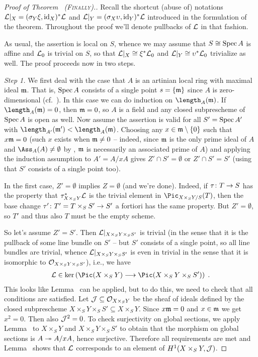\documentclass[a4paper,parskip=half,numbers=enddot, DIV=12]{scrreprt}
\begin{document}
\begin{proof}[Proof of Theorem~ \textsc{(Finally)}.]
	Recall the shortcut (abuse of) notations $\mathcal{L}|_X=(\sigma_Y\xi,\operatorname{id}_X)^*\mathcal{L}$ and $\mathcal{L}|_Y=(\sigma_X\upsilon,\operatorname{id}_Y)^*\mathcal{L}$ introduced in the formulation of the theorem. Throughout the proof we'll denote pullbacks of $\mathcal{L}$ in that fashion.
	
	As usual, the assertion is local on $S$, whence we may assume that $S\cong \operatorname{Spec} A$ is affine and $\mathcal{L}_0$ is trivial on $S$, so that $\mathcal{L}|_X\cong \xi^*\mathcal{L}_0$ and $\mathcal{L}|_Y\cong \upsilon^*\mathcal{L}_0$ trivialize as well. The proof proceeds now in two steps.
	
	\emph{Step 1.} We first deal with the case that $A$ is an artinian local ring with maximal ideal $\mathfrak{m}$. That is, $\operatorname{Spec} A$ consists of a single point $s=\{\mathfrak{m}\}$ since $A$ is zero-dimensional (cf.~\cite[Proposition~3.1.1]{alg2}). In this case we can do induction on $\length_A(\mm)$. If $\length_A(\mm)=0$, then $\mathfrak{m}=0$, so $A$ is a field and any closed subprescheme of $\operatorname{Spec} A$ is open as well. Now assume the assertion is valid for all $S'=\operatorname{Spec} A'$ with $\length_{A'}(\mm')<\length_A(\mm)$. Choosing any $x\in \mathfrak{m}\setminus \{0\}$ such that $x\mathfrak{m} =0$ (such $x$ exists when $\mathfrak{m}\neq 0$ -- indeed, since $\mathfrak{m}$ is the only prime ideal of $A$ and $\Ass_A(A)\neq \emptyset$ by \cite[Corollary~A.3.1]{homalg}, $\mathfrak{m}$ is necessarily an associated prime of $A$) and applying the induction assumption to $A'=A/xA$ gives $Z'\cap S'=\emptyset$ or $Z'\cap S'=S'$ (using that $S'$ consists of a single point too). 
	
	In the first case, $Z'=\emptyset$ implies $Z=\emptyset$ (and we're done). Indeed, if $\tau\colon T\morphism S$ has the property that $\tau_{X\times_SY}^*\mathcal{L}$ is the trivial element in $\Pic_{X\times_SY/S}(T)$, then the base change $\tau'\colon T'=T\times_SS'\morphism S'$ a fortiori has the same property. But $Z'=\emptyset$, so $T'$ and thus also $T$ must be the empty scheme.
	
	So let's assume $Z'=S'$. Then $\mathcal{L}|_{X\times_SY\times_SS'}$ is trivial (in the sense that it is the pullback of some line bundle on $S'$ -- but $S'$ consists of a single point, so all line bundles are trivial, whence $\mathcal{L}|_{X\times_SY\times_SS'}$ is even in trivial in the sense that it is isomorphic to $\mathcal{O}_{X\times_SY\times_SS'}$), i.e., we have
	\begin{align*}
		\Ll\in\ker\left(\Pic(X\times_SY)\morphism\Pic(X\times_SY\times_SS')\right)\;.
	\end{align*}
	This looks like Lemma~ can be applied, but to do this, we need to check that all conditions are satisfied. Let $\mathcal{J}\subseteq \mathcal{O}_{X\times_SY}$ be the sheaf of ideals defined by the closed subprescheme $X\times_SY\times_SS'\subseteq X\times_SY$. Since $x\mathfrak{m}=0$ and $x\in\mathfrak{m}$ we get $x^2=0$. Then also $\mathcal{J}^2=0$. To check surjectivity on global sections, we  apply Lemma~ to $X\times_SY$ and $X\times_SY\times_SS'$ to obtain that the morphism on global sections is $A\epimorphism A/xA$, hence surjective. Therefore all requirements are met and Lemma~ shows that $\mathcal{L}$ corresponds to an element of $H^1(X\times_SY,\mathcal{J})$.
	

\end{proof}
\end{document}
